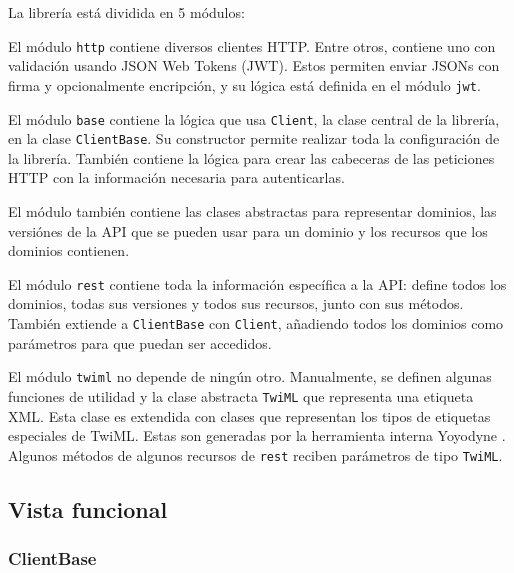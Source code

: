 \documentclass{article}
\begin{document}
La librería está dividida en 5 módulos:

\hfill

El módulo \verb|http| contiene diversos clientes HTTP.
Entre otros,
contiene uno con validación usando JSON Web Tokens (JWT).
Estos permiten enviar JSONs con firma y opcionalmente encripción,
y su lógica está definida en el módulo \verb|jwt|.

\hfill

El módulo \verb|base| contiene
la lógica que usa \verb|Client|,
la clase central de la librería,
en la clase \verb|ClientBase|.
Su constructor permite realizar
toda la configuración de la librería.
También contiene la lógica para 
crear las cabeceras de las peticiones HTTP
con la información necesaria para autenticarlas.

El módulo también contiene las clases abstractas
para representar dominios,
las versiónes de la API que se pueden usar para un dominio
y los recursos que los dominios contienen.

\hfill

El módulo \verb|rest|
contiene toda la información específica a la API:
define todos los dominios,
todas sus versiones y todos sus recursos,
junto con sus métodos.
También extiende a \verb|ClientBase| con \verb|Client|,
añadiendo todos los dominios como parámetros
para que puedan ser accedidos.

\hfill

El módulo \verb|twiml| no depende de ningún otro.
Manualmente, se definen algunas funciones de utilidad
y la clase abstracta \verb|TwiML|
que representa una etiqueta XML.
Esta clase es extendida
con clases que representan los tipos de etiquetas especiales de TwiML.
Estas son generadas por la herramienta interna Yoyodyne
\cite{twilio-generated-yoyodyne}.
Algunos métodos de algunos recursos de \verb|rest|
reciben parámetros de tipo \verb|TwiML|.

\newpage

\subsection{Vista funcional}

\subsubsection{ClientBase}

\hfill
\end{document}
